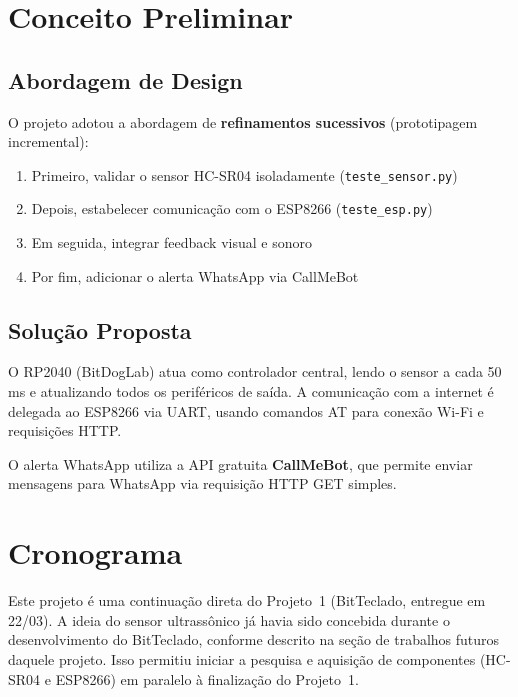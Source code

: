 \documentclass[12pt, a4paper]{article}
\begin{document}
\section{Conceito Preliminar}
\label{sec:conceito}

\subsection{Abordagem de Design}

O projeto adotou a abordagem de \textbf{refinamentos sucessivos} (prototipagem incremental):

\begin{enumerate}
  \item Primeiro, validar o sensor HC-SR04 isoladamente (\texttt{teste\_sensor.py})
  \item Depois, estabelecer comunicação com o ESP8266 (\texttt{teste\_esp.py})
  \item Em seguida, integrar feedback visual e sonoro
  \item Por fim, adicionar o alerta WhatsApp via CallMeBot
\end{enumerate}

\subsection{Solução Proposta}

O RP2040 (BitDogLab) atua como controlador central, lendo o sensor a cada 50\,ms e atualizando todos os periféricos de saída. A comunicação com a internet é delegada ao ESP8266 via UART, usando comandos AT para conexão Wi-Fi e requisições HTTP.

O alerta WhatsApp utiliza a API gratuita \textbf{CallMeBot}, que permite enviar mensagens para WhatsApp via requisição HTTP GET simples.


\section{Cronograma}
\label{sec:cronograma}

Este projeto é uma continuação direta do Projeto~1 (BitTeclado, entregue em 22/03). A ideia do sensor ultrassônico já havia sido concebida durante o desenvolvimento do BitTeclado, conforme descrito na seção de trabalhos futuros daquele projeto. Isso permitiu iniciar a pesquisa e aquisição de componentes (HC-SR04 e ESP8266) em paralelo à finalização do Projeto~1.
\end{document}
